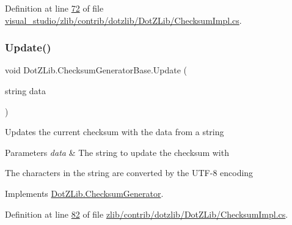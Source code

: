 Definition at line \hyperlink{visual__studio_2zlib_2contrib_2dotzlib_2_dot_z_lib_2_checksum_impl_8cs_source_l00072}{72} of file \hyperlink{visual__studio_2zlib_2contrib_2dotzlib_2_dot_z_lib_2_checksum_impl_8cs_source}{visual\+\_\+studio/zlib/contrib/dotzlib/\+Dot\+Z\+Lib/\+Checksum\+Impl.\+cs}.

\mbox{\label{class_dot_z_lib_1_1_checksum_generator_base_a4f0a5411dbb86714571852000932d66e}} 
\subsubsection{\texorpdfstring{Update()}{Update()}\hspace{0.1cm}{\footnotesize\ttfamily [5/8]}}
{\footnotesize\ttfamily void Dot\+Z\+Lib.\+Checksum\+Generator\+Base.\+Update (\begin{DoxyParamCaption}\item[{string}]{data }\end{DoxyParamCaption})\hspace{0.3cm}{\ttfamily [inline]}}



Updates the current checksum with the data from a string 


\begin{DoxyParams}{Parameters}
{\em data} & The string to update the checksum with\\
\hline
\end{DoxyParams}


The characters in the string are converted by the U\+T\+F-\/8 encoding

Implements \hyperlink{interface_dot_z_lib_1_1_checksum_generator_ac5a728d2dd56479b429648177607fd39}{Dot\+Z\+Lib.\+Checksum\+Generator}.



Definition at line \hyperlink{zlib_2contrib_2dotzlib_2_dot_z_lib_2_checksum_impl_8cs_source_l00082}{82} of file \hyperlink{zlib_2contrib_2dotzlib_2_dot_z_lib_2_checksum_impl_8cs_source}{zlib/contrib/dotzlib/\+Dot\+Z\+Lib/\+Checksum\+Impl.\+cs}.

\mbox{\label{class_dot_z_lib_1_1_checksum_generator_base_a4f0a5411dbb86714571852000932d66e}} 
